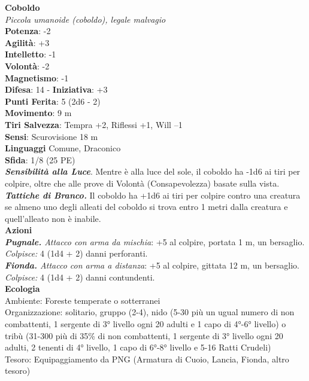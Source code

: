 \begin{multicols}{2}
\medskip\textbf{Coboldo}\\
\emph{Piccola umanoide (coboldo), legale malvagio}\\
\textbf{Potenza}: -2\\
\textbf{Agilità}: +3\\
\textbf{Intelletto}: -1\\
\textbf{Volontà}: -2\\
\textbf{Magnetismo}: -1\\
\textbf{Difesa}: 14 - \textbf{Iniziativa}: +3\\
\textbf{Punti Ferita}: 5 (2d6 - 2)\\
\textbf{Movimento}: 9 m\\
\textbf{Tiri Salvezza}: Tempra +2, Riflessi +1, Will –1\\
\textbf{Sensi}: Scurovisione 18 m\\
\textbf{Linguaggi} Comune, Draconico\\
\textbf{Sfida}: 1/8 (25 PE)\smallskip\\
\emph{\textbf{Sensibilità alla Luce}}. Mentre è alla luce del sole, il coboldo ha -1d6 ai tiri per colpire, oltre che alle prove di Volontà (Consapevolezza) basate sulla vista.\\
\emph{\textbf{Tattiche di Branco.}} Il coboldo ha +1d6 ai tiri per colpire contro una creatura se almeno uno degli alleati del coboldo si trova entro 1 metri dalla creatura e quell'alleato non è inabile. \\
\smallskip\textbf{Azioni}\\
\emph{\textbf{Pugnale.} Attacco con arma da mischia}: +5 al colpire, portata 1 m, un bersaglio.\\
\emph{Colpisce:} 4 (1d4 + 2) danni perforanti.\\
\emph{\textbf{Fionda.} Attacco con arma a distanza}: +5 al colpire, gittata 12 m, un bersaglio.\\
\emph{Colpisce:} 4 (1d4 + 2) danni contundenti.\\
\textbf{Ecologia}\\
Ambiente: Foreste temperate o sotterranei\\
Organizzazione: solitario, gruppo (2-4), nido (5-30 più un ugual numero di non combattenti, 1 sergente di 3° livello ogni 20 adulti e 1 capo di 4°-6° livello) o tribù (31-300 più di 35\% di non combattenti, 1 sergente di 3° livello ogni 20 adulti, 2 tenenti di 4° livello, 1 capo di 6°-8° livello e 5-16 Ratti Crudeli)\\
Tesoro: Equipaggiamento da PNG (Armatura di Cuoio, Lancia, Fionda, altro tesoro)\\

\end{multicols}
